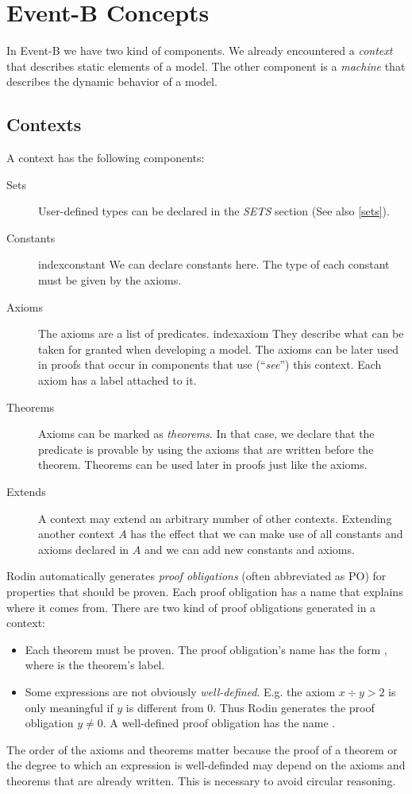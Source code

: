\section{Event-B Concepts}
\label{tut_eventb_concepts}

In Event-B we have two kind of components.
We already encountered a \emph{context} that describes static elements of a model.
The other component is a \emph{machine} that describes the dynamic behavior of a model.

\subsection{Contexts}
\label{tut_concepts_contexts}

A context has the following components:
\begin{description}
\item[Sets]
  User-defined types can be declared in the \textsl{SETS} section
  (See also \ref{sets}).
\item[Constants]
index{constant}
  We can declare constants here. The type of each constant must be given
  by the axioms.
\item[Axioms] The axioms are a list of predicates. 
index{axiom}
  They describe what can be taken for granted when developing a model.
  The axioms can be later used in proofs that occur in components that
  use (``\emph{see}'') this context.
  Each axiom has a label attached to it.
\item[Theorems]
  Axioms can be marked as \emph{theorems}. In that case, we declare that
  the predicate is provable by using the axioms that are written 
  before the theorem.
  Theorems can be used later in proofs just like the axioms.
\item[Extends]
  A context may extend an arbitrary number of other contexts.
  Extending another context $A$ has the effect that we can make use of
  all constants and axioms declared in $A$ and we can add new constants
  and axioms.
\end{description}
Rodin automatically generates \emph{proof obligations} (often abbreviated as PO) for properties that
should be proven. Each proof obligation has a name that explains where it comes from.
There are two kind of proof obligations generated in a context:
\begin{itemize}
  \item Each theorem must be proven. The proof obligation's name has the form 
    , where  is the theorem's label.
  \item Some expressions are not obviously \emph{well-defined}.
    E.g. the axiom $x \div y > 2$ is only meaningful if $y$ is different from 0.
    Thus Rodin generates the proof obligation $y\neq 0$.
    A well-defined proof obligation has the name .
\end{itemize}
The order of the axioms and theorems matter because the proof of a theorem or the degree to which an expression is well-definded may depend on the axioms and theorems that are already written. This is necessary to avoid circular reasoning.


